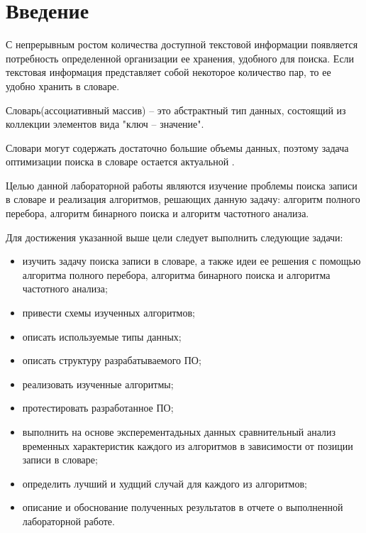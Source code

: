 \chapter*{Введение}

С непрерывным ростом количества доступной текстовой информации появляется потребность определенной организации ее хранения, удобного для поиска. Если текстовая информация представляет собой некоторое количество пар, то ее удобно хранить в словаре. 

Словарь(ассоциативный массив) -- это абстрактный тип данных, состоящий из коллекции элементов вида "ключ -- значение".  

Словари могут содержать достаточно большие объемы данных, поэтому задача оптимизации поиска в словаре остается актуальной \cite{yualianov}. 

Целью данной лабораторной работы являются изучение проблемы поиска записи в словаре и реализация алгоритмов, решающих данную задачу: алгоритм полного перебора, алгоритм бинарного поиска и алгоритм частотного анализа.

Для достижения указанной выше цели следует выполнить следующие задачи:
\begin{itemize}
	\item изучить задачу поиска записи в словаре, а также идеи ее решения с помощью алгоритма полного перебора, алгоритма бинарного поиска и алгоритма частотного анализа;
	\item привести схемы изученных алгоритмов;
	\item описать используемые типы данных;
	\item описать структуру разрабатываемого ПО;
	\item реализовать изученные алгоритмы;
	\item протестировать разработанное ПО;
	\item выполнить на основе эксперементадьных данных сравнительный анализ временных характеристик каждого из алгоритмов в зависимости от позиции записи в словаре;
	\item определить лучший и худщий случай для каждого из алгоритмов;
	\item описание и обоснование полученных результатов в отчете о выполненной лабораторной работе. 
\end{itemize}

